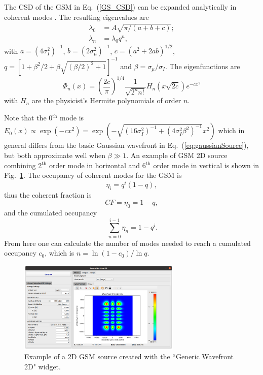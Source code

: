 \documentclass{iopconfser}
\begin{document}
The CSD of the GSM in Eq.~(\ref{GS_CSD}) can be expanded analytically in coherent modes \citep{Starikov82}. The resulting eigenvalues are
\begin{align}
\lambda_0 &= A \sqrt{\pi/( a+b+c)}; \\ 
\lambda_n &= \lambda_0 q ^n,
\end{align}
with $a = (4 \sigma_I^2)^{-1}$, $ 
b = (2 \sigma_{\mu}^2)^{-1}$, $ 
c = (a^2 + 2 a b)^{1/2}$,
$q = [1 + \beta^2/2 + \beta\sqrt{(\beta/2)^2+1}]^{-1}$ 
and $\beta=\sigma_{\mu}/\sigma_I$.
The eigenfunctions are
\begin{equation}
\Phi_n(x) = \left( \frac{2c}{\pi} \right)^{1/4} \frac{1}{\sqrt{2^n n!}} H_n(x\sqrt{2c})e^{-cx^2}
\label{GSeigenvalues}
\end{equation}
with $H_n$ are the physicist's Hermite polynomials of order $n$. 

Note that the 0$^\text{th}$ mode is $E_0(x) \propto \exp(-c x^2) = \exp(-\sqrt{(16 \sigma_I^2)^{-1} + (4 \sigma_I^2 \beta^2)^{-1}} x^2)$ which in general differs from the basic Gaussian wavefront in Eq.~(\ref{eq:gaussianSource}), but both approximate well when $\beta \gg 1$. An example of GSM 2D source combining 2$^\text{th}$ order mode in horizontal and 6$^\text{th}$ order mode in vertical is shown in Fig.~\ref{fig:GSM2D}.
The occupancy of coherent modes for the GSM is   
\begin{equation}\label{eq:GSMoccupancy}
\eta_i = q^i(1-q), 
\end{equation}
thus the coherent fraction is 
\begin{equation}\label{eq:GSMcoherentfraction}
    CF=\eta_0=1-q,
\end{equation}
and the cumulated occupancy
\begin{equation}\label{eq:GSMcumulatedoccupancy}
\ \sum_{n=0}^{i-1} \eta_n = 1-q^i.
\end{equation}
From here one can calculate the number of modes needed to reach a cumulated occupancy $c_0$, which is $n=\ln(1-c_0)/\ln q$.

\begin{figure}
    \centering
    \includegraphics[width=0.69\textwidth]{figures/GSM2D.png}
        
    \caption{Example of a 2D GSM source created with the ``Generic Wavefront 2D" widget.}
    \label{fig:GSM2D}
\end{figure}
\end{document}
